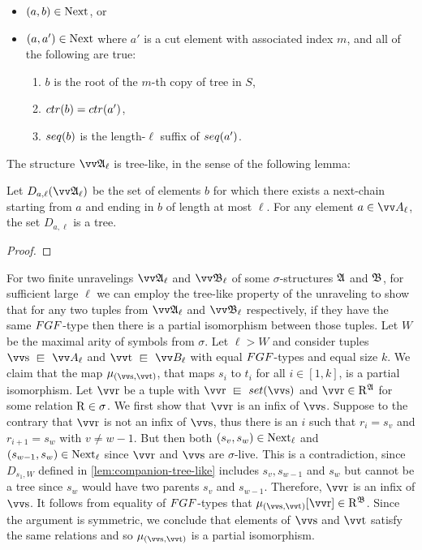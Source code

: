 \begin{itemize}
  \item $(a,b) \in \mathrm{Next}$, or
  \item $(a,a') \in \mathrm{Next}$ where $a'$ is a cut element with associated index $m$, and all of the following are true:
        \begin{enumerate}
          \item $b$ is the root of the $m$-th copy of tree in $S$,
          \item $\ctr{b} = \ctr{a'}$,
          \item $\seq{b}$ is the length-$\ell$ suffix of $\seq{a'}$.
        \end{enumerate}
\end{itemize}

\noindent
The structure $\unravel{A}_{\ell}$ is tree-like, in the sense of the following lemma:
\begin{lemma}\label{lem:companion-tree-like}
  Let $D_{a, \ell}(\unravel{A}_{\ell})$ be the set of elements $b$ for which there exists a next-chain starting from $a$ and ending in $b$ of length at most $\ell$.
  For any element $a \in \unraveldom{A}_{\ell}$, the set $D_{a, \ell}$ is a tree.
\end{lemma}
\begin{proof}
\end{proof}
For two finite unravelings $\unravel{A}_{\ell}$ and $\unravel{B}_{\ell}$ of some $\sigma$-structures ${\mathfrak{A}}$ and ${\mathfrak{B}}$, for sufficient large $\ell$ we can employ the tree-like property of the unraveling to show that for any two tuples from $\unravel{A}_{\ell}$ and $\unravel{B}_{\ell}$ respectively, if they have the same $\FGF$-type then there is a partial isomorphism between those tuples.
Let $W$ be the maximal arity of symbols from $\sigma$.
Let $\ell > W$ and consider tuples $\elemtuptuples \sqin \unraveldom{A}_{\ell}$ and $\elemtuptuplet \sqin \unraveldom{B}_{\ell}$ with equal $\FGF$-types and equal size $k$.
We claim that the map $\mu_{(\elemtuptuples, \elemtuptuplet)}$, that maps $s_{i}$ to $t_{i}$ for all $i \in [1, k]$, is a partial isomorphism.
Let $\elemtuptupler$ be a tuple with $\elemtuptupler \sqin \set(\elemtuptuples)$ and $\elemtuptupler \in \relR^{\str{A}}$ for some relation $\mathrm{R} \in \sigma$.
We first show that $\elemtuptupler$ is an infix of $\elemtuptuples$.
Suppose to the contrary that $\elemtuptupler$ is not an infix of $\elemtuptuples$, thus there is an $i$ such that $r_{i} = s_{v}$ and $r_{i+1} = s_{w}$ with $v \ne w - 1$.
But then both $(s_{v}, s_{w}) \in \mathrm{Next}_{\ell}$ and $(s_{w-1}, s_{w}) \in \mathrm{Next}_{\ell}$ since $\elemtuptupler$ and $\elemtuptuples$ are $\sigma$-live.
This is a contradiction, since $D_{s_{1}, W}$ defined in \cref{lem:companion-tree-like} includes $s_{v}, s_{w-1}$ and $s_{w}$ but cannot be a tree since $s_{w}$ would have two parents $s_{v}$ and $s_{w-1}$.
Therefore, $\elemtuptupler$ is an infix of $\elemtuptuples$.
It follows from equality of $\FGF$-types that $\mu_{(\elemtuptuples, \elemtuptuplet)}[\elemtuptupler] \in \relR^{\str{B}}$.
Since the argument is symmetric, we conclude that elements of $\elemtuptuples$ and $\elemtuptuplet$ satisfy the same relations and so $\mu_{(\elemtuptuples, \elemtuptuplet)}$ is a partial isomorphism.

